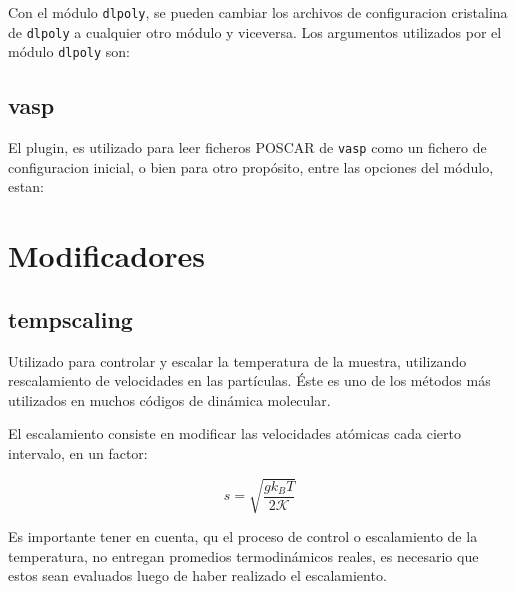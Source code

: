 Con el m\'odulo \verb|dlpoly|, se pueden cambiar los archivos de configuracion cristalina de \verb|dlpoly| a cualquier otro m\'odulo y viceversa. Los argumentos utilizados por el m\'odulo \verb|dlpoly| son:


\subsection{vasp}
El plugin, es utilizado para leer ficheros POSCAR de \verb|vasp| como un fichero de configuracion inicial, o bien para otro prop\'osito, entre las opciones del m\'odulo, estan:

\section{Modificadores}
\subsection{tempscaling}

Utilizado para controlar y escalar la temperatura de la muestra, utilizando rescalamiento de velocidades en las part\'iculas. \'Este es uno de los m\'etodos m\'as utilizados en muchos c\'odigos de din\'amica molecular.

El escalamiento consiste en modificar las velocidades at\'omicas cada cierto intervalo, en un factor:

$$s=\sqrt{\frac{gk_BT}{2\mathcal{K}}}$$

Es importante tener en cuenta, qu el proceso de control o escalamiento de la temperatura, no entregan promedios termodin\'amicos reales, es necesario que estos sean evaluados luego de haber realizado el escalamiento.

